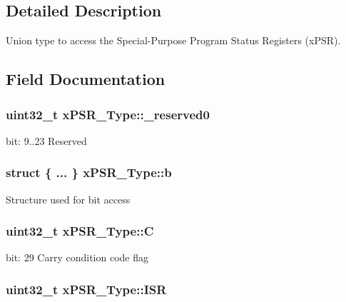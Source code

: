 \subsection{Detailed Description}
Union type to access the Special-\/\-Purpose Program Status Registers (x\-P\-S\-R). 

\subsection{Field Documentation}
\hypertarget{unionxPSR__Type_af438e0f407357e914a70b5bd4d6a97c5}{
\subsubsection[{\-\_\-reserved0}]{\setlength{\rightskip}{0pt plus 5cm}uint32\-\_\-t x\-P\-S\-R\-\_\-\-Type\-::\-\_\-reserved0}}\label{unionxPSR__Type_af438e0f407357e914a70b5bd4d6a97c5}
bit\-: 9..23 Reserved \hypertarget{unionxPSR__Type_a45ed8981cba3995bc0bd339cb99ba018}{
\subsubsection[{b}]{\setlength{\rightskip}{0pt plus 5cm}struct \{ ... \}   x\-P\-S\-R\-\_\-\-Type\-::b}}\label{unionxPSR__Type_a45ed8981cba3995bc0bd339cb99ba018}
Structure used for bit access \hypertarget{unionxPSR__Type_a40213a6b5620410cac83b0d89564609d}{
\subsubsection[{C}]{\setlength{\rightskip}{0pt plus 5cm}uint32\-\_\-t x\-P\-S\-R\-\_\-\-Type\-::\-C}}\label{unionxPSR__Type_a40213a6b5620410cac83b0d89564609d}
bit\-: 29 Carry condition code flag \hypertarget{unionxPSR__Type_a3e9120dcf1a829fc8d2302b4d0673970}{
\subsubsection[{I\-S\-R}]{\setlength{\rightskip}{0pt plus 5cm}uint32\-\_\-t x\-P\-S\-R\-\_\-\-Type\-::\-I\-S\-R}}\label{unionxPSR__Type_a3e9120dcf1a829fc8d2302b4d0673970}
